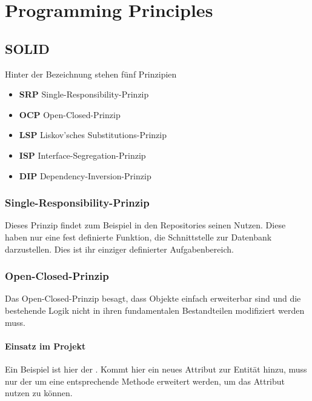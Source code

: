 
\chapter{Programming Principles}

	\section{SOLID \cite{solid.servinc}}
	Hinter der Bezeichnung  stehen fünf Prinzipien
	\begin{itemize}
		\item \textbf{SRP} Single-Responsibility-Prinzip
		\item \textbf{OCP} Open-Closed-Prinzip
		\item \textbf{LSP} Liskov’sches Substitutions-Prinzip
		\item \textbf{ISP} Interface-Segregation-Prinzip
		\item \textbf{DIP} Dependency-Inversion-Prinzip
	\end{itemize}
		\subsection{Single-Responsibility-Prinzip}
		Dieses Prinzip findet zum Beispiel in den Repositories seinen Nutzen. Diese haben nur eine fest definierte Funktion, die Schnittstelle zur Datenbank darzustellen. Dies ist ihr einziger definierter Aufgabenbereich.
		
		\subsection{Open-Closed-Prinzip}
		Das Open-Closed-Prinzip besagt, dass Objekte einfach erweiterbar sind und die bestehende Logik nicht in ihren fundamentalen Bestandteilen modifiziert werden muss. 
			\subsubsection{Einsatz im Projekt}
			Ein Beispiel ist hier der . Kommt hier ein neues Attribut zur Entität hinzu, muss nur der  um eine entsprechende Methode erweitert werden, um das Attribut nutzen zu können.
		

